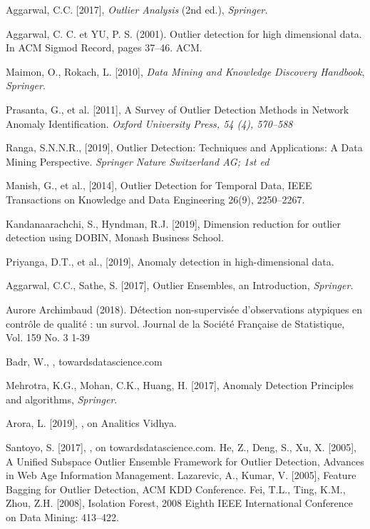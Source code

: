 \begin{thebibliography}{99}

 Aggarwal, C.C. [2017],  \textit{Outlier Analysis} (2nd ed.), {\it Springer.} 

 Aggarwal, C. C. et YU, P. S. (2001). Outlier detection for high dimensional data. In ACM Sigmod Record, pages 37–46. ACM.

 Maimon, O.,  Rokach, L. [2010], \textit{Data Mining and Knowledge Discovery Handbook}, {\it Springer}. 

 Prasanta, G., et al. [2011], A Survey of Outlier Detection Methods in Network Anomaly Identification. {\it Oxford University Press, 54 (4), 570--588}

 Ranga, S.N.N.R., [2019], Outlier Detection: Techniques and Applications: A Data Mining Perspective. {\it Springer Nature Switzerland AG; 1st ed}

 Manish, G., et al., [2014], Outlier Detection for Temporal Data, IEEE Transactions on Knowledge and Data Engineering 26(9), 2250–2267.

 Kandanaarachchi, S., Hyndman, R.J. [2019], Dimension reduction for outlier detection using DOBIN, Monash Business School.

 Priyanga, D.T., et al., [2019],  Anomaly detection in high-dimensional data.

 Aggarwal, C.C., Sathe, S. [2017], Outlier Ensembles, an Introduction, {\it Springer.}

 Aurore Archimbaud (2018). Détection non-supervisée d’observations
atypiques en contrôle de qualité : un survol. Journal de la Société Française de Statistique, Vol. 159 No. 3 1-39


 Badr, W., , towardsdatascience.com 

 Mehrotra, K.G., Mohan, C.K., Huang, H. [2017],  Anomaly Detection Principles and algorithms, {\it Springer}. 

  Arora, L. [2019], , on Analitics Vidhya. 

 Santoyo, S. [2017], , on towardsdatascience.com.
 He, Z., Deng, S., Xu, X. [2005], A Unified Subspace Outlier Ensemble Framework for Outlier Detection, Advances in Web Age Information Management.
 Lazarevic, A., Kumar, V. [2005], Feature Bagging for Outlier Detection, ACM KDD Conference.
 Fei, T.L., Ting, K.M., Zhou, Z.H. [2008], Isolation Forest, 2008 Eighth IEEE International Conference on Data Mining: 413–422.


\end{thebibliography}
